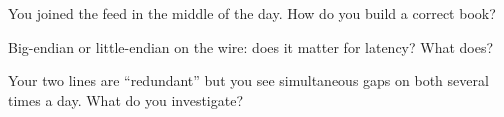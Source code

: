 \begin{interviewq}\label{iq:ll:protocols-ii-binary-exchange-protocols:4}
You joined the feed in the middle of the day. How do you build a correct book?
\end{interviewq}

\begin{interviewq}\label{iq:ll:protocols-ii-binary-exchange-protocols:5}
Big-endian or little-endian on the wire: does it matter for latency? What does?
\end{interviewq}

\begin{interviewq}\label{iq:ll:protocols-ii-binary-exchange-protocols:6}
Your two lines are ``redundant'' but you see simultaneous gaps on both several times a day. What do you investigate?
\end{interviewq}

